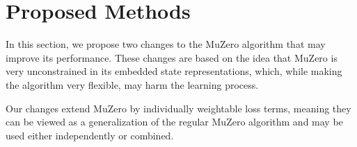 \section{Proposed Methods}
In this section, we propose two changes to the MuZero algorithm that may improve its performance. These changes are based on the idea that MuZero is very unconstrained in its embedded state representations, which, while making the algorithm very flexible, may harm the learning process.

Our changes extend MuZero by individually weightable loss terms, meaning they can be viewed as a generalization of the regular MuZero algorithm and may be used either independently or combined.


